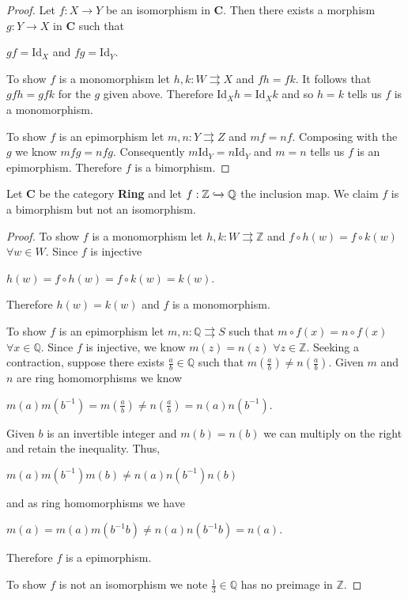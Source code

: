 \documentclass{article}
\newcommand{\Q}{\mathbb{Q}}
\newcommand{\Z}{\mathbb{Z}}
\begin{document}
	\begin{proof}
		Let $f:X\xrightarrow{}Y$ be an isomorphism in \textbf{C}. 
		Then there exists a morphism $g:Y\xrightarrow{}X$ in \textbf{C} such that 
		\begin{center}
			$gf=$Id$_X$ and $fg=$Id$_Y$.
		\end{center}
		
		To show $f$ is a monomorphism let $h,k:W \rightrightarrows X$ and $fh=fk$.
		It follows that $gfh=gfk$ for the $g$ given above.
		Therefore Id$_X h=$Id$_X k$ and so $h=k$ tells us $f$ is a monomorphism.
		
		To show $f$ is an epimorphism let $m,n:Y \rightrightarrows Z$ and $mf=nf$.
		Composing with the $g$ we know $mfg=nfg$.
		Consequently $m$Id$_Y=n$Id$_Y$ and $m=n$ tells us $f$ is an epimorphism.
		Therefore $f$ is a bimorphism.
	\end{proof}
	
	\vspace{2mm}
	
	\noindent Let \textbf{C} be the category \textbf{Ring} and let $f:\Z \xhookrightarrow[]{} \Q$ the inclusion map.
	We claim $f$ is a bimorphism but not an isomorphism.
	
	\begin{proof}
		To show $f$ is a monomorphism let $h,k:W \rightrightarrows \Z$ and $f\circ h(w)=f \circ k (w)$ $\forall w\in W$.
		Since $f$ is injective
		\begin{center}
			$h(w)=f\circ h(w)=f\circ k(w)=k(w)$.
		\end{center}
		Therefore $h(w)=k(w)$ and $f$ is a monomorphism.
		
		To show $f$ is an epimorphism let $m,n:\Q \rightrightarrows S$ such that $m\circ f(x)=n\circ f(x)$ $\forall x\in \Q$.
		Since $f$ is injective, we know $m(z)=n(z)$ $\forall z\in\Z$.
		Seeking a contraction, suppose there exists $\frac{a}{b}\in \Q$ such that $m(\frac{a}{b})\neq n(\frac{a}{b})$.
		Given $m$ and $n$ are ring homomorphisms we know
		\begin{center}
			$m(a)m(b^{-1})=m(\frac{a}{b}) \neq n(\frac{a}{b})=n(a)n(b^{-1})$.
		\end{center}
		Given $b$ is an invertible integer and $m(b)=n(b)$ we can multiply on the right and retain the inequality.
		Thus, 
		\begin{center}
			$m(a)m(b^{-1})m(b)\neq n(a)n(b^{-1})n(b)$
		\end{center} 
		and as ring homomorphisms we have
		\begin{center}
			$m(a)=m(a)m(b^{-1}b)\neq n(a)n(b^{-1}b)=n(a)$.
		\end{center}
		Therefore $f$ is a epimorphism.
		
		To show $f$ is not an isomorphism we note $\frac{1}{3}\in \Q$ has no preimage in $\Z$.
	\end{proof}
\end{document}
